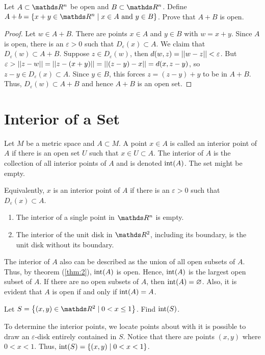 \documentclass[../main-sheet.tex]{subfiles}
\begin{document}
\begin{prob}
    Let $ A\subset \R^n $ be open and $ B\subset \R^n $. Define $ A+b=\set{x+y\in \R^n\mid x\in A \text{ and }y\in B} $. Prove that $ A+B $ is open.
\end{prob}
\begin{proof}
    Let $ w\in A+B $. There are points $ x\in A $ and $ y\in B $ with $ w=x+y $. Since $ A $ is open, there is an $ \varepsilon>0 $ such that $ D_{\varepsilon}(x)\subset A $. We claim that $ D_{\varepsilon}(w)\subset A+B $. Suppose $ z\in D_{\varepsilon}(w) $, then $ d(w,z)=\left\vert\left\vert w-z\right\vert\right\vert<\varepsilon $. But $ \varepsilon>\left\vert\left\vert z-w\right\vert\right\vert=\left\vert\left\vert z-(x+y)\right\vert\right\vert=\left\vert\left\vert(z-y)-x\right\vert\right\vert=d(x,z-y)$, so $ z-y\in D_{\varepsilon}(x)\subset A $. Since $ y\in B $, this forces $ z=(z-y)+y $ to be in $ A+B $. Thus, $ D_{\varepsilon}(w) \subset A+B $ and hence $ A+B $ is an open set.
\end{proof}
\section{Interior of a Set}
\begin{defn}
    Let $ M $ be a metric space and $ A\subset M $. A point $ x\in A $ is called an interior point of $ A $ if there is an open set $ U $ such that $ x\in U\subset A $. The interior of $ A $ is the collection of all interior points of $ A $ and is denoted $ \operatorname{int}(A) $. The set might be empty.
\end{defn}

Equivalently, $ x $ is an interior point of $ A $ if there is an $ \varepsilon>0 $ such that $ D_{\varepsilon}(x)\subset A $.
\begin{ex}
    \hfill
    \begin{enumerate}
        \item The interior of a single point in $ \R^n $ is empty.
        \item The interior of the unit disk in $ \R^2 $, including its boundary, is the unit disk without its boundary. 
    \end{enumerate}
\end{ex}
The interior of $ A $ also can be described as the union of all open subsets of $ A $. Thus, by theorem (\ref{thm:2}), $ \operatorname{int}(A) $ is open. Hence, $\operatorname{int} (A) $ is the largest open subset of $ A $. If there are no open subsets of $ A $, then $\operatorname{int} (A)=\varnothing $. Also, it is evident that $ A $ is open if and only if $ \operatorname{int}(A)=A $.
\begin{prob}
    Let $ S=\set{(x,y)\in\R^2\mid 0<x\leq 1 } $. Find $ \operatorname{int}(S) $.
\end{prob}
\begin{soln}
    To determine the interior points, we locate points about with it is possible to draw an $ \varepsilon $-disk entirely contained in $ S $. Notice that there are points $ (x,y) $ where $ 0<x<1 $. Thus, $ \operatorname{int}(S)=\left\{(x,y)\mid 0<x<1\right\} $.
\end{soln}
\end{document}
